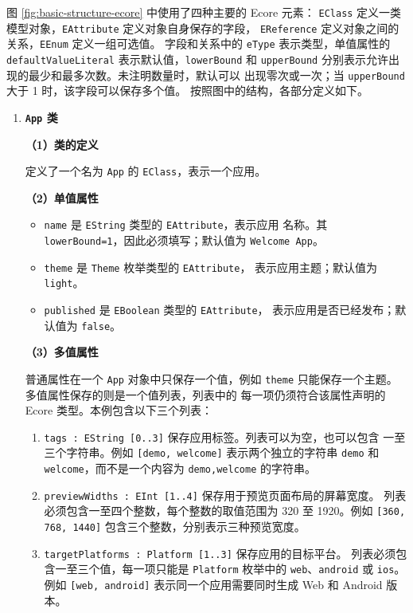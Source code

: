 图 \ref{fig:basic-structure-ecore} 中使用了四种主要的 Ecore 元素：
\texttt{EClass} 定义一类模型对象，\texttt{EAttribute} 定义对象自身保存的字段，
\texttt{EReference} 定义对象之间的关系，\texttt{EEnum} 定义一组可选值。
字段和关系中的 \texttt{eType} 表示类型，单值属性的
\texttt{defaultValueLiteral} 表示默认值，\texttt{lowerBound} 和
\texttt{upperBound} 分别表示允许出现的最少和最多次数。未注明数量时，默认可以
出现零次或一次；当 \texttt{upperBound} 大于 1 时，该字段可以保存多个值。
按照图中的结构，各部分定义如下。

\begin{enumerate}
  \item \textbf{\texttt{App} 类}

  \textbf{（1）类的定义}

  定义了一个名为 \texttt{App} 的 \texttt{EClass}，表示一个应用。

  \textbf{（2）单值属性}

  \begin{itemize}
    \item \texttt{name} 是 \texttt{EString} 类型的 \texttt{EAttribute}，表示应用
    名称。其 \texttt{lowerBound=1}，因此必须填写；默认值为
    \texttt{Welcome App}。
    \item \texttt{theme} 是 \texttt{Theme} 枚举类型的 \texttt{EAttribute}，
    表示应用主题；默认值为 \texttt{light}。
    \item \texttt{published} 是 \texttt{EBoolean} 类型的 \texttt{EAttribute}，
    表示应用是否已经发布；默认值为 \texttt{false}。
  \end{itemize}

  \textbf{（3）多值属性}

  普通属性在一个 \texttt{App} 对象中只保存一个值，例如
  \texttt{theme} 只能保存一个主题。多值属性保存的则是一个值列表，列表中的
  每一项仍须符合该属性声明的 Ecore 类型。本例包含以下三个列表：

  \begin{enumerate}
    \item \texttt{tags : EString [0..3]} 保存应用标签。列表可以为空，也可以包含
    一至三个字符串。例如 \texttt{[demo, welcome]} 表示两个独立的字符串
    \texttt{demo} 和 \texttt{welcome}，而不是一个内容为
    \texttt{demo,welcome} 的字符串。
    \item \texttt{previewWidths : EInt [1..4]} 保存用于预览页面布局的屏幕宽度。
    列表必须包含一至四个整数，每个整数的取值范围为 320 至 1920。例如
    \texttt{[360, 768, 1440]} 包含三个整数，分别表示三种预览宽度。
    \item \texttt{targetPlatforms : Platform [1..3]} 保存应用的目标平台。
    列表必须包含一至三个值，每一项只能是 \texttt{Platform} 枚举中的
    \texttt{web}、\texttt{android} 或 \texttt{ios}。例如
    \texttt{[web, android]} 表示同一个应用需要同时生成 Web 和 Android 版本。
  \end{enumerate}


\end{enumerate}
